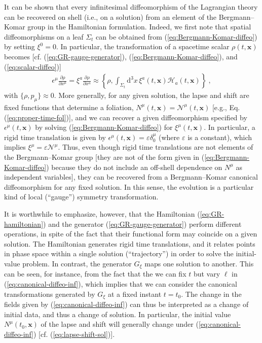 \documentclass[12pt]{iopart}
\def\eq#1{\begin{equation}\begin{aligned}#1\end{aligned}\end{equation}}
\def\eref#1{(\ref{eq:#1})}
\def\D{\mathrm{d}}
\def\del#1#2{\frac{\partial#1}{\partial#2}}
\def\x{\mathbf{x}}
\begin{document}
It can be shown that every infinitesimal diffeomorphism of the Lagrangian theory can be recovered on shell (i.e., on a solution) from an element of the Bergmann--Komar group in the Hamiltonian formulation. Indeed, we first note that spatial diffeomorphisms on a leaf $\Sigma_t$ can be obtained from \eref{Bergmann-Komar-diffeo} by setting $\xi^0 = 0$. In particular, the transformation of a spacetime scalar $\rho(t,\x)$ becomes [cf. \eref{GR-gauge-generator}, \eref{Bergmann-Komar-diffeo}, and \eref{scalar-diffeo}]
\eq{\label{eq:scalar-3-diffeo}
\epsilon^{\mu}\del{\rho}{x^{\mu}} = \xi^a\del{\rho}{x^a} \approx \left\{\rho,\int_{\Sigma_t}\D^3x\,\xi^a(t,\x)\mathcal{H}_a(t,\x)\right\} \ ,
}
with $\{\rho,p_{\mu}\}\approx 0$. More generally, for any given solution, the lapse and shift are fixed functions that determine a foliation, $N^{\mu}(t,\x)=\mathcal{N}^{\mu}(t,\x)$ [e.g., Eq. \eref{proper-time-fol}], and we can recover a given diffeomorphism specified by $\epsilon^{\mu}(t,\x)$ by solving \eref{Bergmann-Komar-diffeo} for $\xi^{\mu}(t,\x)$. In particular, a rigid time translation is given by $\epsilon^{\mu}(t,\x)=\varepsilon\delta^{\mu}_0$ (where $\varepsilon$ is a constant), which implies $\xi^{\mu}=\varepsilon\mathcal{N}^{\mu}$. Thus, even though rigid time translations are not elements of the Bergmann--Komar group [they are not of the form given in \eref{Bergmann-Komar-diffeo} because they do not include an off-shell dependence on $N^{\mu}$ as independent variables], they can be recovered from a Bergmann--Komar canonical diffeomorphism for any fixed solution. In this sense, the evolution is a particular kind of local (``gauge'') symmetry transformation.

It is worthwhile to emphasize, however, that the Hamiltonian \eref{GR-hamiltonian} and the generator \eref{GR-gauge-generator} perform different operations, in spite of the fact that their functional form may coincide on a given solution. The Hamiltonian generates rigid time translations, and it relates points in phase space within a single solution (``trajectory'') in order to solve the initial-value problem. In contrast, the generator $G_{\xi}$ maps one solution to another. This can be seen, for instance, from the fact that the we can fix $t$ but vary $\ell$ in \eref{canonical-diffeo-inf}, which implies that we can consider the canonical transformations generated by $G_{\xi}$ at a fixed instant $t=t_0$. The change in the fields given by \eref{canonical-diffeo-inf} can thus be interpreted as a change of initial data, and thus a change of solution. In particular, the initial value $N^{\mu}(t_0,\x)$ of the lapse and shift will generally change under \eref{canonical-diffeo-inf} [cf. \eref{lapse-shift-sol}].
\end{document}
